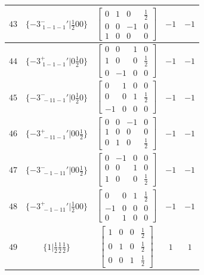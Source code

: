 \documentclass[fleqn,8pt]{jsarticle}
\begin{document}
\begin{longtable}{ccccc}
$ 43 $ & $ \{-3^{-}_{\,\,1-1-1}{}'|\frac{1}{2} 0 0\} $ & $ \begin{bmatrix} 0 & 1 & 0 & \frac{1}{2} \\ 0 & 0 & -1 & 0 \\ 1 & 0 & 0 & 0 \end{bmatrix} $ & $ -1 $ & $ -1 $ \\ \hline
$ 44 $ & $ \{-3^{+}_{\,\,1-1-1}{}'|0 \frac{1}{2} 0\} $ & $ \begin{bmatrix} 0 & 0 & 1 & 0 \\ 1 & 0 & 0 & \frac{1}{2} \\ 0 & -1 & 0 & 0 \end{bmatrix} $ & $ -1 $ & $ -1 $ \\ \hline
$ 45 $ & $ \{-3^{-}_{\,\,-11-1}{}'|0 \frac{1}{2} 0\} $ & $ \begin{bmatrix} 0 & 1 & 0 & 0 \\ 0 & 0 & 1 & \frac{1}{2} \\ -1 & 0 & 0 & 0 \end{bmatrix} $ & $ -1 $ & $ -1 $ \\ \hline
$ 46 $ & $ \{-3^{+}_{\,\,-11-1}{}'|0 0 \frac{1}{2}\} $ & $ \begin{bmatrix} 0 & 0 & -1 & 0 \\ 1 & 0 & 0 & 0 \\ 0 & 1 & 0 & \frac{1}{2} \end{bmatrix} $ & $ -1 $ & $ -1 $ \\ \hline
$ 47 $ & $ \{-3^{-}_{\,\,-1-11}{}'|0 0 \frac{1}{2}\} $ & $ \begin{bmatrix} 0 & -1 & 0 & 0 \\ 0 & 0 & 1 & 0 \\ 1 & 0 & 0 & \frac{1}{2} \end{bmatrix} $ & $ -1 $ & $ -1 $ \\ \hline
$ 48 $ & $ \{-3^{+}_{\,\,-1-11}{}'|\frac{1}{2} 0 0\} $ & $ \begin{bmatrix} 0 & 0 & 1 & \frac{1}{2} \\ -1 & 0 & 0 & 0 \\ 0 & 1 & 0 & 0 \end{bmatrix} $ & $ -1 $ & $ -1 $ \\ \hline
$ 49 $ & $ \{1|\frac{1}{2} \frac{1}{2} \frac{1}{2}\} $ & $ \begin{bmatrix} 1 & 0 & 0 & \frac{1}{2} \\ 0 & 1 & 0 & \frac{1}{2} \\ 0 & 0 & 1 & \frac{1}{2} \end{bmatrix} $ & $ 1 $ & $ 1 $ \\ \hline

\end{longtable}
\end{document}
